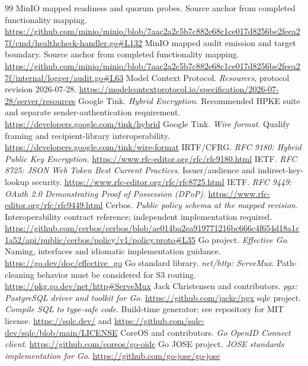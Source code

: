 \documentclass[11pt,a4paper]{article}
\begin{document}
\begin{thebibliography}{99}
 MinIO mapped readiness and quorum probes. Source anchor from completed functionality mapping. \url{https://github.com/minio/minio/blob/7aac2a2c5b7c882e68c1ce017d8256be2feea27f/cmd/healthcheck-handler.go#L132}
 MinIO mapped audit emission and target boundary. Source anchor from completed functionality mapping. \url{https://github.com/minio/minio/blob/7aac2a2c5b7c882e68c1ce017d8256be2feea27f/internal/logger/audit.go#L63}
 Model Context Protocol. \emph{Resources}, protocol revision 2026-07-28. \url{https://modelcontextprotocol.io/specification/2026-07-28/server/resources}
 Google Tink. \emph{Hybrid Encryption}. Recommended HPKE suite and separate sender-authentication requirement. \url{https://developers.google.com/tink/hybrid}
 Google Tink. \emph{Wire format}. Qualify framing and recipient-library interoperability. \url{https://developers.google.com/tink/wire-format}
 IRTF/CFRG. \emph{RFC 9180: Hybrid Public Key Encryption}. \url{https://www.rfc-editor.org/rfc/rfc9180.html}
 IETF. \emph{RFC 8725: JSON Web Token Best Current Practices}. Issuer/audience and indirect-key-lookup security. \url{https://www.rfc-editor.org/rfc/rfc8725.html}
 IETF. \emph{RFC 9449: OAuth 2.0 Demonstrating Proof of Possession (DPoP)}. \url{https://www.rfc-editor.org/rfc/rfc9449.html}
 Cerbos. \emph{Public policy schema at the mapped revision}. Interoperability contract reference; independent implementation required. \url{https://github.com/cerbos/cerbos/blob/ae014ba2ea919771216bc666c4f654d18a1c1a52/api/public/cerbos/policy/v1/policy.proto#L35}
 Go project. \emph{Effective Go}. Naming, interfaces and idiomatic implementation guidance. \url{https://go.dev/doc/effective_go}
 Go standard library. \emph{net/http: ServeMux}. Path-cleaning behavior must be considered for S3 routing. \url{https://pkg.go.dev/net/http#ServeMux}
 Jack Christensen and contributors. \emph{pgx: PostgreSQL driver and toolkit for Go}. \url{https://github.com/jackc/pgx}
 sqlc project. \emph{Compile SQL to type-safe code}. Build-time generator; see repository for MIT license. \url{https://sqlc.dev/} and \url{https://github.com/sqlc-dev/sqlc/blob/main/LICENSE}
 CoreOS and contributors. \emph{Go OpenID Connect client}. \url{https://github.com/coreos/go-oidc}
 Go JOSE project. \emph{JOSE standards implementation for Go}. \url{https://github.com/go-jose/go-jose}

\end{thebibliography}
\end{document}
